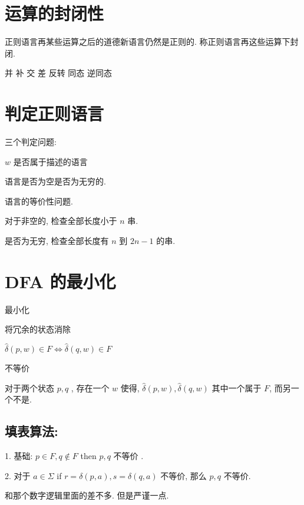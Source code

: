 \documentclass[12pt]{ctexart}
\theoremstyle{definition}
\theoremstyle{definition}
\theoremstyle{plain}
\theoremstyle{remark}
\begin{document}
\section{运算的封闭性}\label{sec:feng}
正则语言再某些运算之后的道德新语言仍然是正则的. 
称正则语言再这些运算下封闭. 

并
补
交
差
反转
同态
逆同态



\section{判定正则语言}\label{sec:panding}

三个判定问题: 

\(w\) 是否属于描述的语言

语言是否为空是否为无穷的. 

语言的等价性问题. 

对于非空的, 检查全部长度小于 \(n\) 串. 

是否为无穷, 检查全部长度有 \(n\) 到 \(2 n - 1\) 的串. 


\section{DFA 的最小化}\label{sec:}

最小化

将冗余的状态消除

\(\hat\delta (p , w ) \in F \iff\hat\delta ( q , w ) \in F\)

不等价

对于两个状态 \(p, q\) , 存在一个 \(w\) 使得, \( \hat{\delta} (p , w )  , \hat\delta (q, w )\) 其中一个属于 \(F\), 而另一个不是. 

\subsection{填表算法:}\label{sse:table}
1. 基础: \( p \in F , q \notin F\) then \(p , q \) 不等价 .

2. 对于 \(a \in \Sigma\)  if \( r =\delta (p , a ) , s =\delta (q , a ) \) 不等价, 那么 \(p, q \) 不等价. 

和那个数字逻辑里面的差不多. 但是严谨一点.
\end{document}
